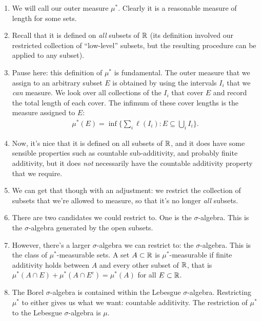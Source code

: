 \begin{enumerate}
\item We will call our outer measure $\mu^*$. Clearly it is a reasonable measure of length for some sets.

\item Recall that it is defined on {\it all} subsets of $\mathbb{R}$ (its definition involved our restricted collection of
  ``low-level​'' subsets, but the resulting procedure can be applied to any subset).

\item Pause here: this definition of $\mu^*$ is fundamental. The outer measure that we assign to an arbitrary
  subset $E$ is obtained by using the intervals $I_i$ that we {\it can} measure. We look over all collections of
  the $I_i$ that cover $E$ and record the total length of each cover. The infimum of these cover lengths is the
  measure assigned to $E$:
  \begin{align*}
    \mu^*(E) = \inf\Big\{\sum_i \ell(I_i) : E \subseteq \bigcup_i I_i\Big\}.
  \end{align*}
\item Now, it's nice that it is defined on all subsets of $\mathbb{R}$, and it does have some sensible properties such as
  countable sub-additivity, and probably finite additivity, but it does {\it not} necessarily have the countable
  additivity property that we require.

\item We can get that though with an adjustment: we restrict the collection of subsets that we're allowed to
  measure, so that it's no longer {\it all} subsets.

\item There are two candidates we could restrict to. One is the  $\sigma$-algebra. This is the
  $\sigma$-algebra generated by the open subsets.

\item However, there's a larger $\sigma$-algebra we can restrict to: the  $\sigma$-algebra. This is the class
  of $\mu^*$-measurable sets. A set $A \subset \mathbb{R}$ is $\mu^*$-measurable if finite additivity holds between $A$
  and every other subset of $\mathbb{R}$, that is $\mu^*(A \cap E) + \mu^*(A \cap E^c) = \mu^*(A)$ for
  all $E \subset \mathbb{R}$.

\item The Borel $\sigma$-algebra is contained within the Lebesgue $\sigma$-algebra. Restricting $\mu^*$ to either
  gives us what we want: countable additivity. The restriction of $\mu^*$ to the Lebesgue $\sigma$-algebra is
   $\mu$.


\end{enumerate}
